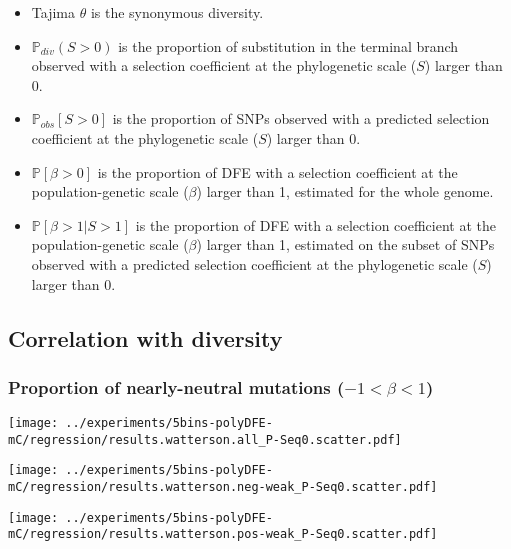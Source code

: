 \documentclass{article}
\newcommand{\proba}{\mathbb{P}}
\newcommand{\Sphy}{S}
\newcommand{\divAdv}{ \Sphy > 1}
\newcommand{\Spop}{\beta}
\newcommand{\polyNeutral}{-1 < \Spop < 1}
\newcommand{\polyAdv}{ \Spop > 1}
\begin{document}
    \begin{itemize}
        \item Tajima $\theta$ is the synonymous diversity.
        \item $\mathbb{P}_{div}(S > 0)$ is the proportion of substitution in the terminal branch observed with a selection coefficient at the phylogenetic scale ($\Sphy$) larger than 0.
        \item $\mathbb{P}_{obs}[S>0]$ is the proportion of SNPs observed with a predicted selection coefficient at the phylogenetic scale ($\Sphy$) larger than 0.
        \item $\mathbb{P} [ \beta > 0 ]$ is the proportion of DFE with a selection coefficient at the population-genetic scale ($\Spop$) larger than 1, estimated for the whole genome.
        \item $\proba [ \polyAdv | \divAdv]$ is the proportion of DFE with a selection coefficient at the population-genetic scale ($\Spop$) larger than 1, estimated on the subset of SNPs observed with a predicted selection coefficient at the phylogenetic scale ($\Sphy$) larger than 0.
    \end{itemize}

    \subsection{Correlation with diversity}

    \subsubsection{Proportion of nearly-neutral mutations ($\polyNeutral$)}

    \begin{minipage}{0.32\linewidth}
        \texttt{[image: ../experiments/5bins-polyDFE-mC/regression/results.watterson.all\_P-Seq0.scatter.pdf]}
    \end{minipage}
    \begin{minipage}{0.32\linewidth}
        \texttt{[image: ../experiments/5bins-polyDFE-mC/regression/results.watterson.neg-weak\_P-Seq0.scatter.pdf]}
    \end{minipage}
    \begin{minipage}{0.32\linewidth}
        \texttt{[image: ../experiments/5bins-polyDFE-mC/regression/results.watterson.pos-weak\_P-Seq0.scatter.pdf]}
    \end{minipage}
\end{document}
